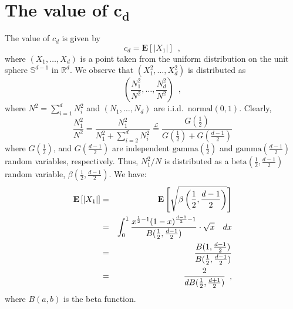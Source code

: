\documentclass[charterfonts,lotsofwhite]{patmorin}
\newcommand{\E}{\mathbf{E}}
\begin{document}





\appendix
\section{The value of $\mathbf{c_d}$}

The value of $c_d$ is given by
\[
  c_d = \E \left[|X_1| \right] \enspace ,
\]
where $(X_1,\ldots,X_d)$ is a point taken from the uniform
distribution on the unit sphere $\mathbb{S}^{d-1}$ in $\mathbb{R}^d$.
We observe that $(X_1^2,\ldots,X_d^2)$ is distributed as 
\[
\left(\frac{N_1^2}{N^2},\ldots,\frac{N_d^2}{N^2}\right) \enspace ,
\]
where $N^2=\sum_{i=1}^d N_i^2$ and $(N_1,\ldots,N_d)$ are i.i.d.\
$\mathrm{normal}(0,1)$.  Clearly,
\[
\frac{N_1^2}{N^2} = \frac{N_1^2}{N_1^2+\sum_{i=2}^dN_i^2}
  \stackrel{\mathcal{L}}{=} \frac{G(\frac{1}{2})}{G(\frac{1}{2})+G(\frac{d-1}{2})}
\]
where $G(\frac{1}{2})$, and $G(\frac{d-1}{2})$ are independent
$\mathrm{gamma}(\frac{1}{2})$ and $\mathrm{gamma}(\frac{d-1}{2})$
random variables, respectively.  Thus, $N_1^2/N$ is distributed as a
$\mathrm{beta}(\frac{1}{2},\frac{d-1}{2})$ random variable,
$\beta(\frac{1}{2},\frac{d-1}{2})$.  We have:
\begin{eqnarray*}
\E\left[|X_1|\right]
 & = & \E\left[\sqrt{\beta\left(\frac{1}{2},\frac{d-1}{2}\right)}\right] \\
 & = & \int_0^1\frac{x^{\frac{1}{2}-1}(1-x)^{\frac{d-1}{2}-1}}
                    {B(\frac{1}{2},\frac{d-1}{2})}\cdot\sqrt{x} \quad dx\\
 & = & \frac{B(1,\frac{d-1}{2})}{B(\frac{1}{2},\frac{d-1}{2})}\\
\comment{ & = & d\cdot 
       \frac{\Gamma(\frac{d-1}{2})}
            {\Gamma(\frac{d+1}{2})} \cdot
       \frac{\Gamma(\frac{d}{2})}
            {\Gamma(\frac{1}{2})\cdot\Gamma(\frac{d-1}{2})} \\
 & = & \frac{d\Gamma(\frac{d}{2})}
            {\Gamma(\frac{1}{2})\cdot\Gamma(\frac{d+1}{2})} \\ 
 & = & \frac{2\Gamma(\frac{d}{2}+1)}
            {\Gamma(\frac{1}{2})\cdot\Gamma(\frac{d+1}{2})} \\
}
 & = & \frac{2}{dB(\frac{1}{2},\frac{d+1}{2})} \enspace , 
\end{eqnarray*}
where $B(a,b)$ is the beta function.
\end{document}
